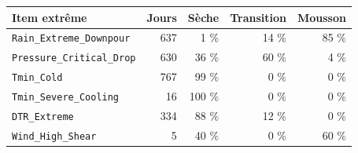 \small
\begin{tabular}{lrrrr}
\toprule
\rowcolor{NuitBleue!90}
\color{white}\textbf{Item extrême} & \color{white}\textbf{Jours} & \color{white}\textbf{Sèche} & \color{white}\textbf{Transition} & \color{white}\textbf{Mousson} \\
\midrule
\texttt{Rain\_Extreme\_Downpour} & 637 & 1 \% & 14 \% & 85 \% \\
\texttt{Pressure\_Critical\_Drop} & 630 & 36 \% & 60 \% & 4 \% \\
\texttt{Tmin\_Cold} & 767 & 99 \% & 0 \% & 0 \% \\
\texttt{Tmin\_Severe\_Cooling} & 16 & 100 \% & 0 \% & 0 \% \\
\texttt{DTR\_Extreme} & 334 & 88 \% & 12 \% & 0 \% \\
\texttt{Wind\_High\_Shear} & 5 & 40 \% & 0 \% & 60 \% \\
\bottomrule
\end{tabular}
